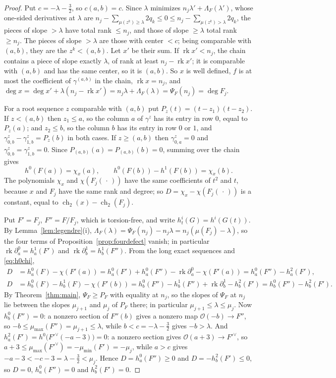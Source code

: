 \documentclass[11pt]{amsart}
\theoremstyle{definition}
\theoremstyle{remark}
\newcommand{\OO}{\mathcal{O}}
\DeclareMathOperator{\rk}{rk}
\begin{document}
\begin{proof}
Put $c=-\lambda-\frac32$, so $c(a,b)=c$. Since $\lambda$ minimizes $n_j\lambda'+\Lambda_F(\lambda')$, whose one-sided derivatives at $\lambda$ are $n_j-\sum_{\mu(z^k)\ge\lambda}2q_k\le0\le n_j-\sum_{\mu(z^k)>\lambda}2q_k$, the pieces of slope $>\lambda$ have total rank $\le n_j$, and those of slope $\ge\lambda$ total rank $\ge n_j$. The pieces of slope $>\lambda$ are those with center $<c$; being comparable with $(a,b)$, they are the $z^k<(a,b)$. Let $x'$ be their sum. If $\rk x'<n_j$, the chain contains a piece of slope exactly $\lambda$, of rank at least $n_j-\rk x'$; it is comparable with $(a,b)$ and has the same center, so it is $(a,b)$. So $x$ is well defined, $f$ is at most the coefficient of $\gamma^{(a,b)}$ in the chain, $\rk x=n_j$, and $\deg x=\deg x'+\lambda(n_j-\rk x')=n_j\lambda+\Lambda_F(\lambda)=\Psi_F(n_j)=\deg F_j$.

For a root sequence $z$ comparable with $(a,b)$ put $P_z(t)=(t-z_1)(t-z_2)$. If $z<(a,b)$ then $z_1\le a$, so the column $a$ of $\gamma^z$ has its entry in row $0$, equal to $P_z(a)$; and $z_2\le b$, so the column $b$ has its entry in row $0$ or $1$, and $\gamma^z_{0,b}-\gamma^z_{1,b}=P_z(b)$ in both cases. If $z\ge(a,b)$ then $\gamma^z_{0,a}=0$ and $\gamma^z_{0,b}=\gamma^z_{1,b}=0$. Since $P_{(a,b)}(a)=P_{(a,b)}(b)=0$, summing over the chain gives
\begin{equation}\label{eq:h0chi}
h^0(F(a))=\chi_x(a),\qquad h^0(F(b))-h^1(F(b))=\chi_x(b).
\end{equation}
The polynomials $\chi_x$ and $\chi(F_j(\,\cdot\,))$ have the same coefficients of $t^2$ and $t$, because $x$ and $F_j$ have the same rank and degree; so $D=\chi_x-\chi(F_j(\,\cdot\,))$ is a constant, equal to $\operatorname{ch}_2(x)-\operatorname{ch}_2(F_j)$.

Put $F'=F_j$, $F''=F/F_j$, which is torsion-free, and write $h^i_t(G)=h^i(G(t))$. By Lemma~\ref{lem:legendre}(i), $\Lambda_F(\lambda)=\Psi_F(n_j)-n_j\lambda=n_j(\mu(F_j)-\lambda)$, so the four terms of Proposition~\ref{prop:fourdefect} vanish; in particular $\rk\partial^0_a=h^1_a(F')$ and $\rk\partial^1_b=h^1_b(F'')$. From the long exact sequences and \eqref{eq:h0chi},
\begin{align*}
D&=h^0_a(F)-\chi(F'(a))=h^0_a(F')+h^0_a(F'')-\rk\partial^0_a-\chi(F'(a))=h^0_a(F'')-h^2_a(F'),\\
D&=h^0_b(F)-h^1_b(F)-\chi(F'(b))=h^0_b(F'')-h^1_b(F'')+\rk\partial^1_b-h^2_b(F')=h^0_b(F'')-h^2_b(F').
\end{align*}
By Theorem~\ref{thm:main}, $\Psi_F\ge P_F$ with equality at $n_j$, so the slopes of $\Psi_F$ at $n_j$ lie between the slopes $\mu_{j+1}$ and $\mu_j$ of $P_F$ there; in particular $\mu_{j+1}\le\lambda\le\mu_j$. Now $h^0_b(F'')=0$: a nonzero section of $F''(b)$ gives a nonzero map $\OO(-b)\to F''$, so $-b\le\mu_{\max}(F'')=\mu_{j+1}\le\lambda$, while $b<c=-\lambda-\frac32$ gives $-b>\lambda$. And $h^2_a(F')=h^0\big(F'^\vee(-a-3)\big)=0$: a nonzero section gives $\OO(a+3)\to F'^\vee$, so $a+3\le\mu_{\max}(F'^\vee)=-\mu_{\min}(F')=-\mu_j$, while $a>c$ gives $-a-3<-c-3=\lambda-\frac32<\mu_j$. Hence $D=h^0_a(F'')\ge0$ and $D=-h^2_b(F')\le0$, so $D=0$, $h^0_a(F'')=0$ and $h^2_b(F')=0$.
\end{proof}
\end{document}
